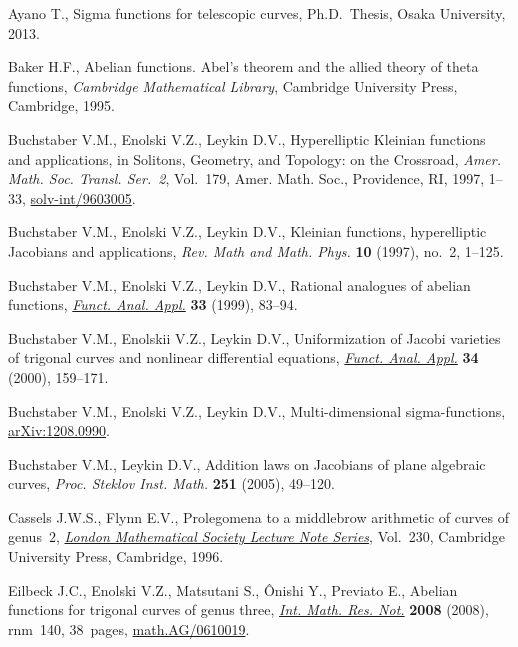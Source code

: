 \documentclass[pdftex]{sigma}
\numberwithin{equation}{section}
\theoremstyle{definition}
\begin{document}
\begin{thebibliography}{99}
\footnotesize\itemsep=0pt

Ayano T., Sigma functions for telescopic curves, Ph.D.~Thesis, Osaka
 University, 2013.

Baker H.F., Abelian functions. Abel's theorem and the allied theory of theta
 functions, \textit{Cambridge Mathematical Library}, Cambridge University Press,
 Cambridge, 1995.

Buchstaber V.M., Enolski V.Z., Leykin D.V., Hyperelliptic {K}leinian functions
 and applications, in Solitons, Geometry, and Topology: on the Crossroad,
 \textit{Amer. Math. Soc. Transl. Ser.~2}, Vol.~179, Amer. Math. Soc.,
 Providence, RI, 1997, 1--33, \href{http://arxiv.org/abs/solv-int/9603005}{solv-int/9603005}.

Buchstaber V.M., Enolski V.Z., Leykin D.V., Kleinian functions, hyperelliptic
 {J}acobians and applications, \textit{Rev. Math and Math. Phys.} \textbf{10}
 (1997), no.~2, 1--125.

Buchstaber V.M., Enolski V.Z., Leykin D.V., Rational analogues of abelian
 functions, \href{https://doi.org/10.1007/BF02465189}{\textit{Funct. Anal. Appl.}} \textbf{33} (1999), 83--94.

Buchstaber V.M., Enolskii V.Z., Leykin D.V., Uniformization of {J}acobi
 varieties of trigonal curves and nonlinear dif\/ferential equations,
 \href{https://doi.org/10.1007/BF02482405}{\textit{Funct. Anal. Appl.}} \textbf{34} (2000), 159--171.

Buchstaber V.M., Enolski V.Z., Leykin D.V., Multi-dimensional sigma-functions,
 \href{http://arxiv.org/abs/1208.0990}{arXiv:1208.0990}.

Buchstaber V.M., Leykin D.V., Addition laws on {J}acobians of plane algebraic
 curves, \textit{Proc. Steklov Inst. Math.} \textbf{251} (2005), 49--120.

Cassels J.W.S., Flynn E.V., Prolegomena to a middlebrow arithmetic of curves of
 genus~{$2$}, \href{https://doi.org/10.1017/CBO9780511526084}{\textit{London Mathematical Society Lecture Note Series}}, Vol.~230, Cambridge University Press, Cambridge, 1996.

Eilbeck J.C., Enolski V.Z., Matsutani S., \^Onishi Y., Previato E., Abelian
 functions for trigonal curves of genus three, \href{https://doi.org/10.1093/imrn/rnm140}{\textit{Int. Math. Res. Not.}}
 \textbf{2008} (2008), rnm~140, 38~pages, \href{http://arxiv.org/abs/math.AG/0610019}{math.AG/0610019}.


\end{thebibliography}
\end{document}
